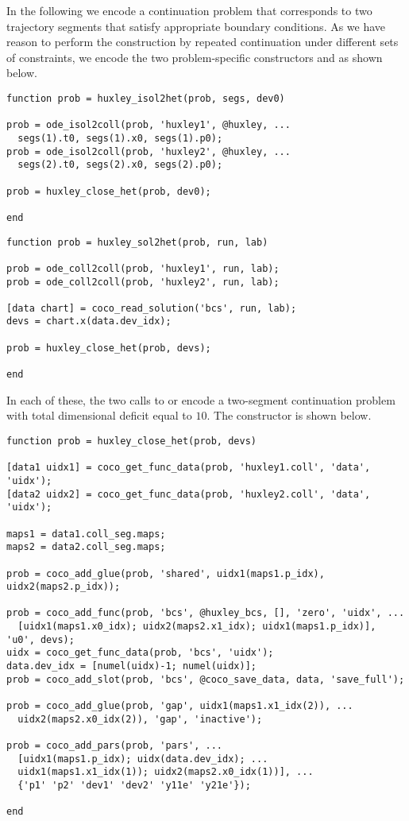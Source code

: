 In the following we encode a continuation problem that corresponds to two trajectory segments that satisfy appropriate boundary conditions. As we have reason to perform the construction by repeated continuation under different sets of constraints, we encode the two problem-specific constructors  and  as shown below.
\begin{lstlisting}[language=coco-highlight]
function prob = huxley_isol2het(prob, segs, dev0)

prob = ode_isol2coll(prob, 'huxley1', @huxley, ...
  segs(1).t0, segs(1).x0, segs(1).p0);
prob = ode_isol2coll(prob, 'huxley2', @huxley, ...
  segs(2).t0, segs(2).x0, segs(2).p0);

prob = huxley_close_het(prob, dev0);

end
\end{lstlisting}
\begin{lstlisting}[language=coco-highlight]
function prob = huxley_sol2het(prob, run, lab)

prob = ode_coll2coll(prob, 'huxley1', run, lab);
prob = ode_coll2coll(prob, 'huxley2', run, lab);

[data chart] = coco_read_solution('bcs', run, lab);
devs = chart.x(data.dev_idx);

prob = huxley_close_het(prob, devs);

end
\end{lstlisting}
In each of these, the two calls to  or  encode a two-segment continuation problem with total dimensional deficit equal to $10$. The  constructor is shown below.
\begin{lstlisting}[language=coco-highlight]
function prob = huxley_close_het(prob, devs)

[data1 uidx1] = coco_get_func_data(prob, 'huxley1.coll', 'data', 'uidx');
[data2 uidx2] = coco_get_func_data(prob, 'huxley2.coll', 'data', 'uidx');

maps1 = data1.coll_seg.maps;
maps2 = data2.coll_seg.maps;

prob = coco_add_glue(prob, 'shared', uidx1(maps1.p_idx), uidx2(maps2.p_idx));

prob = coco_add_func(prob, 'bcs', @huxley_bcs, [], 'zero', 'uidx', ...
  [uidx1(maps1.x0_idx); uidx2(maps2.x1_idx); uidx1(maps1.p_idx)], 'u0', devs);
uidx = coco_get_func_data(prob, 'bcs', 'uidx');
data.dev_idx = [numel(uidx)-1; numel(uidx)];
prob = coco_add_slot(prob, 'bcs', @coco_save_data, data, 'save_full');

prob = coco_add_glue(prob, 'gap', uidx1(maps1.x1_idx(2)), ...
  uidx2(maps2.x0_idx(2)), 'gap', 'inactive');

prob = coco_add_pars(prob, 'pars', ...
  [uidx1(maps1.p_idx); uidx(data.dev_idx); ...
  uidx1(maps1.x1_idx(1)); uidx2(maps2.x0_idx(1))], ...
  {'p1' 'p2' 'dev1' 'dev2' 'y11e' 'y21e'});

end
\end{lstlisting}
